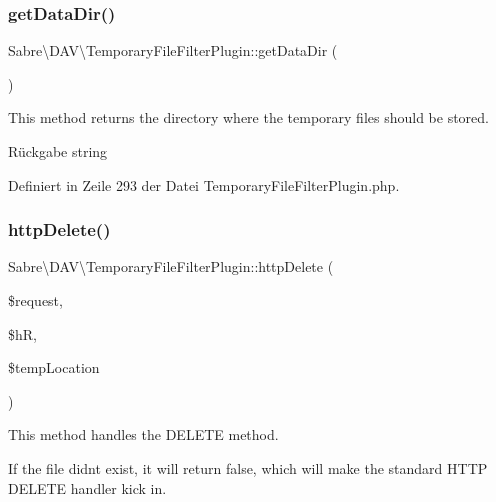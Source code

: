 \subsubsection{\texorpdfstring{get\+Data\+Dir()}{getDataDir()}}
{\footnotesize\ttfamily Sabre\textbackslash{}\+D\+A\+V\textbackslash{}\+Temporary\+File\+Filter\+Plugin\+::get\+Data\+Dir (\begin{DoxyParamCaption}{ }\end{DoxyParamCaption})\hspace{0.3cm}{\ttfamily [protected]}}

This method returns the directory where the temporary files should be stored.

\begin{DoxyReturn}{Rückgabe}
string 
\end{DoxyReturn}


Definiert in Zeile 293 der Datei Temporary\+File\+Filter\+Plugin.\+php.

\mbox{\label{class_sabre_1_1_d_a_v_1_1_temporary_file_filter_plugin_a76eb0e2c6608bfbea0da86ff4dc83992}} 
\subsubsection{\texorpdfstring{http\+Delete()}{httpDelete()}}
{\footnotesize\ttfamily Sabre\textbackslash{}\+D\+A\+V\textbackslash{}\+Temporary\+File\+Filter\+Plugin\+::http\+Delete (\begin{DoxyParamCaption}\item[{\mbox{\hyperlink{interface_sabre_1_1_h_t_t_p_1_1_request_interface}{Request\+Interface}}}]{\$request,  }\item[{\mbox{\hyperlink{interface_sabre_1_1_h_t_t_p_1_1_response_interface}{Response\+Interface}}}]{\$hR,  }\item[{}]{\$temp\+Location }\end{DoxyParamCaption})}

This method handles the D\+E\+L\+E\+TE method.

If the file didn\textquotesingle{}t exist, it will return false, which will make the standard H\+T\+TP D\+E\+L\+E\+TE handler kick in.


